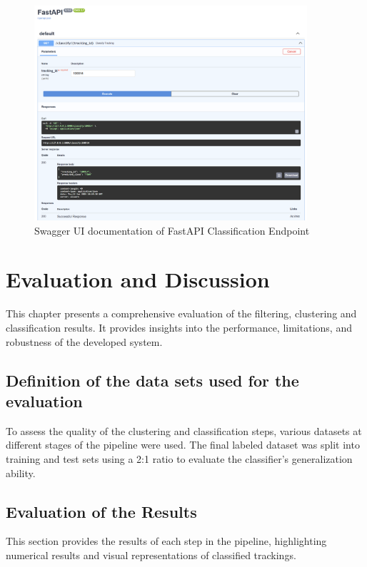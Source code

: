 \documentclass[a4paper,12pt,twoside]{scrreprt}
\begin{document}
\begin{figure}[htbp]
  \centering

  \includegraphics[width=0.9\textwidth]{Figures/api/fastapi_documentation.png}
  \caption{Swagger UI documentation of FastAPI Classification Endpoint}
  \label{fig:fastapi_docs}
\end{figure}

\chapter{Evaluation and Discussion}
This chapter presents a comprehensive evaluation of the filtering, clustering
and
classification results.
It provides insights into the performance, limitations, and robustness of the
developed system.

\section{Definition of the data sets used for the evaluation}

To assess the quality of the clustering and classification steps, various
datasets at different stages of the pipeline were used.
The final labeled dataset was split into training and test sets using a 2:1
ratio to evaluate the classifier's generalization ability.

\section{Evaluation of the Results}
This section provides the results of each step in the pipeline, highlighting
numerical results and visual representations of classified trackings.
\end{document}
